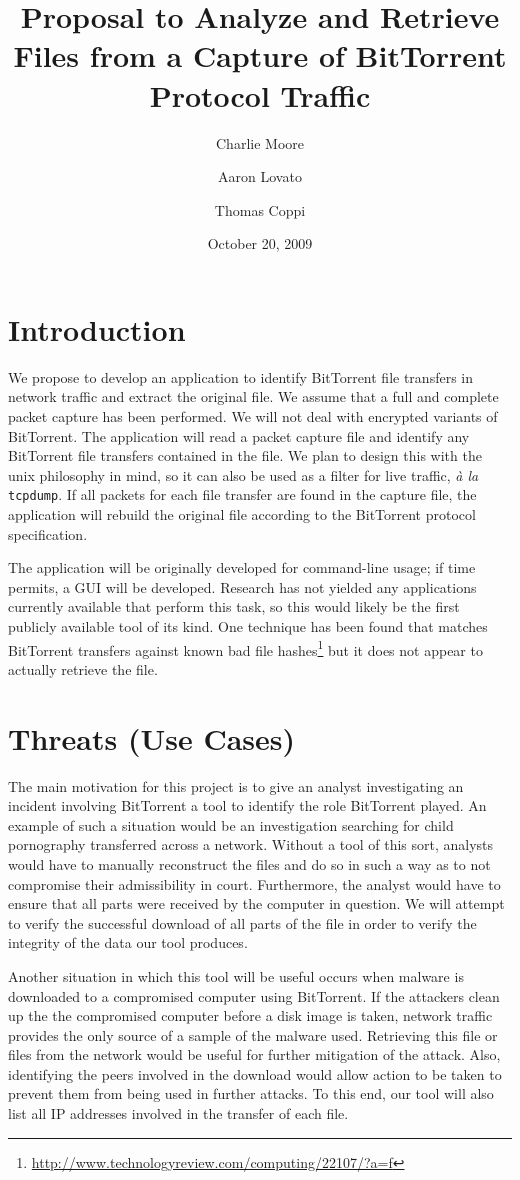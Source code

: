 \documentclass[11pt]{article}
\author{Charlie Moore \and Aaron Lovato \and Thomas Coppi}
\title{Proposal to Analyze and Retrieve Files from a Capture of BitTorrent
  Protocol Traffic}
\date{October 20, 2009}
\begin{document}
\maketitle

\section{Introduction}
We propose to develop an application to identify BitTorrent file transfers in
network traffic and extract the original file.  We assume that a full and
complete packet capture has been performed.  We will not deal with encrypted
variants of BitTorrent. The application will read a packet capture file and
identify any BitTorrent file transfers contained in the file. We plan to design
this with the unix philosophy in mind, so it can also be used as a filter for
live traffic, \emph{\`a la} \verb=tcpdump=. If all packets for each file
transfer are found in the capture file, the application will rebuild the
original file according to the BitTorrent protocol specification.

The application will be originally developed for command-line usage; if time
permits, a GUI will be developed. Research has not yielded any applications
currently available that perform this task, so this would likely be the first
publicly available tool of its kind. One technique has been found that matches
BitTorrent transfers against known bad file
hashes\footnote{\url{http://www.technologyreview.com/computing/22107/?a=f}} but
it does not appear to actually retrieve the file.

\section{Threats (Use Cases)}
The main motivation for this project is to give an analyst investigating an
incident involving BitTorrent a tool to identify the role BitTorrent played.  An
example of such a situation would be an investigation searching for child
pornography transferred across a network. Without a tool of this sort, analysts
would have to manually reconstruct the files and do so in such a way as to not
compromise their admissibility in court. Furthermore, the analyst would have to
ensure that all parts were received by the computer in question. We will attempt
to verify the successful download of all parts of the file in order to verify
the integrity of the data our tool produces. 

Another situation in which this tool will be useful occurs when malware is
downloaded to a compromised computer using BitTorrent. If the attackers clean up
the the compromised computer before a disk image is taken, network traffic
provides the only source of a sample of the malware used. Retrieving this file
or files from the network would be useful for further mitigation of the
attack. Also, identifying the peers involved in the download would allow action
to be taken to prevent them from being used in further attacks. To this end, our
tool will also list all IP addresses involved in the transfer of each file.
\end{document}
